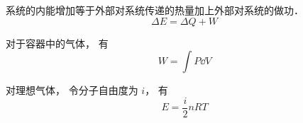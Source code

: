 
系统的内能增加等于外部对系统传递的热量加上外部对系统的做功．
\begin{equation}\label{Th1Law_eq1}
\Delta E = \Delta Q + W
\end{equation}

对于容器中的气体， 有
\begin{equation}
W = \int P \dd{V}
\end{equation}

对理想气体， 令分子自由度为 $i$， 有
\begin{equation}
E = \frac{i}{2}n RT
\end{equation}
